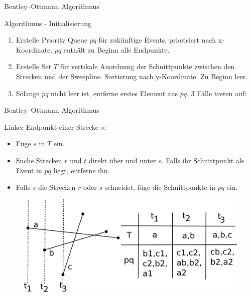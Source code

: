 \documentclass[18pt]{beamer}
\begin{document}
\begin{frame}{Bentley–Ottmann Algorithmus}
	\begin{block}{Algorithmus - Initialisierung}
		\begin{enumerate}
			\item Erstelle Priority Queue $pq$ für zukünftige Events, priorisiert nach x-Koordinate. $pq$ enthält zu Beginn alle Endpunkte.
			\item Erstelle Set $T$ für vertikale Anordnung der Schnittpunkte zwischen den Strecken und der Sweepline. Sortierung nach y-Koordinate. Zu Beginn leer.
			\item Solange $pq$ nicht leer ist, entferne erstes Element aus $pq$. 3 Fälle treten auf:
		\end{enumerate}
	\end{block}
\end{frame}

\begin{frame}{Bentley–Ottmann Algorithmus}
	\begin{block}{Linker Endpunkt einer Strecke $s$:}
		\begin{itemize}
			\item Füge $s$ in $T$ ein.
			\item Suche Strecken $r$ und $t$ direkt über und unter $s$. Falls ihr Schnittpunkt als Event in $pq$ liegt, entferne ihn.
			\item Falls $s$ die Strecken $r$ oder $s$ schneidet, füge die Schnittpunkte in $pq$ ein.
		\end{itemize}
	\end{block}
	\begin{figure}
		\includegraphics[scale=0.8]{logos/insert.png}\\
	\end{figure}
\end{frame}
\end{document}
